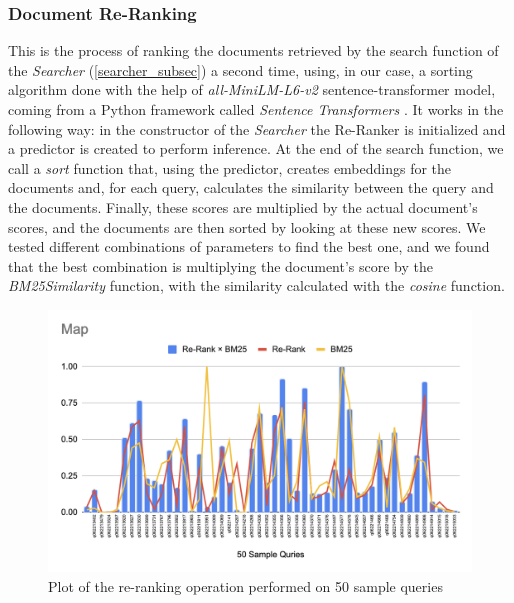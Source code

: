 \subsubsection{Document Re-Ranking}
This is the process of ranking the documents retrieved by the search function of the \textit{Searcher} (\ref{searcher_subsec}) a second time, using, in our case, a sorting algorithm done with the help of \textit{all-MiniLM-L6-v2} \cite{huggingfaceallminilml6v2} sentence-transformer model, coming from a Python framework called \textit{Sentence Transformers} \cite{sentence-transformers}.
\newline
It works in the following way: in the constructor of the \textit{Searcher} the Re-Ranker is initialized and a predictor is created to perform inference. 
At the end of the search function, we call a \textit{sort} function that, using the predictor, creates embeddings for the documents and, for each query, calculates the similarity between the query and the documents.
Finally, these scores are multiplied by the actual document's scores, and the documents are then sorted by looking at these new scores.
\newline
We tested different combinations of parameters to find the best one, and we found that the best combination is multiplying the document's score by the \textit{BM25Similarity} function, with the similarity calculated with the \textit{cosine} function.
\begin{figure}[!ht]
    \centering
    \includegraphics[scale=0.45, keepaspectratio]{figure/re-ranking}
    \caption{Plot of the re-ranking operation performed on 50 sample queries}
    \label{fig:re-rankinge}
\end{figure}

\clearpage

